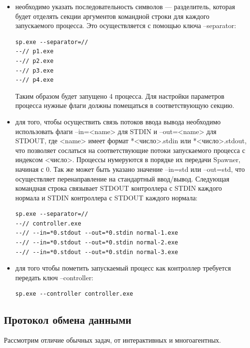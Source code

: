 \documentclass{imcs}
\begin{document}
\begin{itemize}
\item { необходимо указать последовательность символов — разделитель, которая будет отделять секции аргументов командной строки для каждого запускаемого процесса. Это осуществляется с помощью ключа --separator:
\begin{lstlisting}
sp.exe --separator=//
--// p1.exe
--// p2.exe
--// p3.exe
--// p4.exe
\end{lstlisting}
Таким образом будет запущено 4 процесса. Для настройки параметров процесса нужные флаги должны помещаться в соответствующую секцию.
}
\item { для того, чтобы осуществить связь потоков ввода вывода необходимо использовать флаги --in=<name> для STDIN и --out=<name> для STDOUT, где <name> имеет формат *<число>.stdin или *<число>.stdout, что позволяет сослаться на соответствующие потоки запускаемого процесса с индексом <число>. Процессы нумеруются в порядке их передачи Spawner, начиная с 0. Так же может быть указано значение --in=std или --out=std, что осуществляет перенаправление на стандартный ввод/вывод. Следующая командная строка связывает STDOUT контроллера с STDIN каждого нормала и STDIN контроллера с STDOUT каждого нормала:
\begin{lstlisting}
sp.exe --separator=//
--// controller.exe
--// --in=*0.stdout --out=*0.stdin normal-1.exe
--// --in=*0.stdout --out=*0.stdin normal-2.exe
--// --in=*0.stdout --out=*0.stdin normal-3.exe
\end{lstlisting}
}
\item { для того чтобы пометить запускаемый процесс как контроллер требуется передать ключ --controller:}
\begin{lstlisting}
sp.exe --controller controller.exe
\end{lstlisting}
\end{itemize}

\subsection{Протокол обмена данными}
Рассмотрим отличие обычных задач, от интерактивных и многоагентных.
\end{document}
